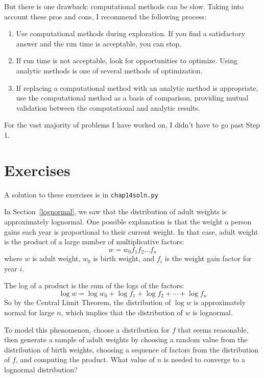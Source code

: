 \documentclass[12pt]{book}
\begin{document}
But there is one drawback: computational methods can be slow.  Taking
into account these pros and cons, I recommend the following process:

\begin{enumerate}

\item Use computational methods during exploration.  If you find a
  satisfactory answer and the run time is acceptable, you can stop.

\item If run time is not acceptable, look for opportunities to
  optimize.  Using analytic methods is one of several methods of
  optimization.

\item If replacing a computational method with an analytic method is
  appropriate, use the computational method as a basis of comparison, 
  providing mutual validation between the computational and
  analytic results.

\end{enumerate}

For the vast majority of problems I have worked on, I didn't have
to go past Step 1.


\section{Exercises}

A solution to these exercises is in \verb"chap14soln.py"

\begin{exercise}
\label{log_clt}
In Section~\ref{lognormal}, we saw that the distribution
of adult weights is approximately lognormal.  One possible
explanation is that the weight a person
gains each year is proportional to their current weight.
In that case, adult weight is the product of a large number
of multiplicative factors:
%
\[ w = w_0 f_1 f_2 \ldots f_n  \]
%
where $w$ is adult weight, $w_0$ is birth weight, and $f_i$
is the weight gain factor for year $i$.

The log of a product is the sum of the logs of the
factors:
%
\[ \log w = \log w_0 + \log f_1 + \log f_2 + \cdots + \log f_n \]
%
So by the Central Limit Theorem, the distribution of $\log w$ is
approximately normal for large $n$, which implies that the
distribution of $w$ is lognormal.

To model this phenomenon, choose a distribution for $f$ that seems
reasonable, then generate a sample of adult weights by choosing a
random value from the distribution of birth weights, choosing a
sequence of factors from the distribution of $f$, and computing the
product.  What value of $n$ is needed to converge to a lognormal
distribution?


\end{exercise}
\end{document}
